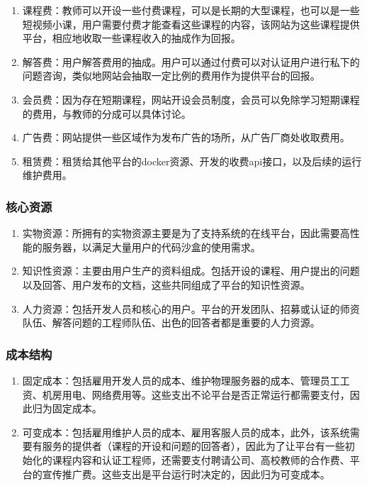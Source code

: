 \documentclass[a4paper]{ctexart}
\begin{document}
\begin{enumerate}[label=\alph*.]
  \item 课程费：教师可以开设一些付费课程，可以是长期的大型课程，也可以是一些短视频小课，用户需要付费才能查看这些课程的内容，该网站为这些课程提供平台，相应地收取一些课程收入的抽成作为回报。
  \item 解答费：用户解答费用的抽成。用户可以通过付费可以对认证用户进行私下的问题咨询，类似地网站会抽取一定比例的费用作为提供平台的回报。
  \item 会员费：因为存在短期课程，网站开设会员制度，会员可以免除学习短期课程的费用，与教师的分成可以具体讨论。
  \item 广告费：网站提供一些区域作为发布广告的场所，从广告厂商处收取费用。
  \item 租赁费：租赁给其他平台的docker资源、开发的收费api接口，以及后续的运行维护费用。
\end{enumerate}

\subsubsection{核心资源}

\begin{enumerate}[label=\alph*.]
  \item 实物资源：所拥有的实物资源主要是为了支持系统的在线平台，因此需要高性能的服务器，以满足大量用户的代码沙盒的使用需求。
  \item 知识性资源：主要由用户生产的资料组成。包括开设的课程、用户提出的问题以及回答、用户发布的文档，这些共同组成了平台的知识性资源。
  \item 人力资源：包括开发人员和核心的用户。平台的开发团队、招募或认证的师资队伍、解答问题的工程师队伍、出色的回答者都是重要的人力资源。
\end{enumerate}

\subsubsection{成本结构}

\begin{enumerate}[label=\alph*.]
  \item 固定成本：包括雇用开发人员的成本、维护物理服务器的成本、管理员工工资、机房用电、网络费用等。这些支出不论平台是否正常运行都需要支付，因此归为固定成本。
  \item 可变成本：包括雇用维护人员的成本、雇用客服人员的成本，此外，该系统需要有服务的提供者（课程的开设和问题的回答者），因此为了让平台有一些初始化的课程内容和认证工程师，还需要支付聘请公司、高校教师的合作费、平台的宣传推广费。这些支出是平台运行时决定的，因此归为可变成本。
\end{enumerate}
\end{document}
